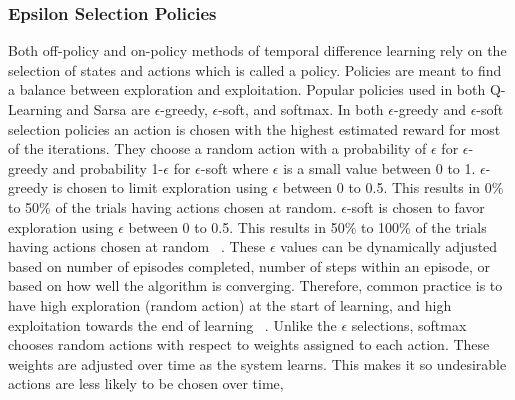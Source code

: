 \documentclass[12pt,american]{report}
\begin{document}
        \subsubsection{Epsilon Selection Policies}
        Both off-policy and on-policy methods of temporal difference learning rely on the selection of states and actions which is called a policy.  Policies are meant to find a balance between exploration and exploitation. Popular policies used in both Q-Learning and Sarsa are \begin{math}\epsilon\end{math}-greedy, \begin{math}\epsilon\end{math}-soft, and softmax.  In both \begin{math}\epsilon\end{math}-greedy and \begin{math}\epsilon\end{math}-soft selection policies an action is chosen with the highest estimated reward for most of the iterations. They choose a random action with a probability of \begin{math}\epsilon\end{math} for \begin{math}\epsilon\end{math}-greedy and probability 1-\begin{math}\epsilon\end{math} for \begin{math}\epsilon\end{math}-soft where \begin{math}\epsilon\end{math} is a small value between 0 to 1. \begin{math}\epsilon\end{math}-greedy is chosen to limit exploration using \begin{math}\epsilon\end{math} between 0 to 0.5. This results in 0\% to 50\% of the trials having actions chosen at random.  \begin{math}\epsilon\end{math}-soft is chosen to favor exploration using \begin{math}\epsilon\end{math} between 0 to 0.5. This results in 50\% to 100\% of the trials having actions chosen at random ~\cite{Eden}. These $\epsilon$ values can be dynamically adjusted based on number of episodes completed, number of steps within an episode, or based on how well the algorithm is converging.  Therefore, common practice is to have high exploration (random action) at the start of learning, and high exploitation towards the end of learning ~\cite{Greedy}.  Unlike the \begin{math}\epsilon\end{math} selections, softmax chooses random actions with respect to weights assigned to each action. These weights are adjusted over time as the system learns. This makes it so undesirable actions are less likely to be chosen over time, 
\end{document}
